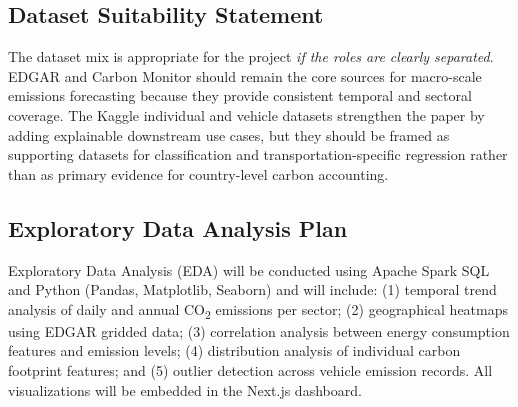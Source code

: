 \documentclass[conference]{IEEEtran}
\begin{document}
\begin{table}[h]
\caption{Dataset Overview}
\label{tab:datasets}
\centering
\scriptsize
{}
\end{table}

\subsection{Dataset Suitability Statement}
The dataset mix is appropriate for the project \textit{if the roles are clearly separated}. EDGAR and Carbon Monitor should remain the core sources for macro-scale emissions forecasting because they provide consistent temporal and sectoral coverage. The Kaggle individual and vehicle datasets strengthen the paper by adding explainable downstream use cases, but they should be framed as supporting datasets for classification and transportation-specific regression rather than as primary evidence for country-level carbon accounting.

\subsection{Exploratory Data Analysis Plan}
Exploratory Data Analysis (EDA) will be conducted using Apache Spark SQL and Python (Pandas, Matplotlib, Seaborn) and will include: (1) temporal trend analysis of daily and annual CO\textsubscript{2} emissions per sector; (2) geographical heatmaps using EDGAR gridded data; (3) correlation analysis between energy consumption features and emission levels; (4) distribution analysis of individual carbon footprint features; and (5) outlier detection across vehicle emission records. All visualizations will be embedded in the Next.js dashboard.
\end{document}
